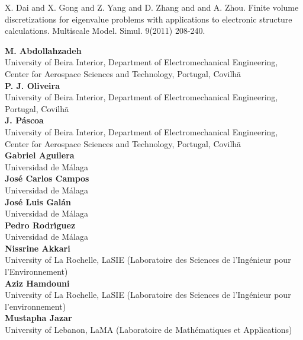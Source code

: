 \documentclass[article,A4,11pt]{llncs}%
\begin{document}

\begin{thebibliography}{10}
{\sc X. Dai and X. Gong and Z. Yang and D. Zhang and and A. Zhou}. {Finite volume discretizations for eigenvalue problems with applications to electronic structure calculations}. Multiscale Model. Simul. 9(2011) 208-240.
\end{thebibliography}

\newpage
    \noindent
    {\bf M. Abdollahzadeh}\\
    University of Beira Interior, Department of Electromechanical Engineering, Center for Aerospace Sciences and Technology, Portugal, Covilhã\\
        \noindent
    {\bf P. J. Oliveira}\\
    University of Beira Interior, Department of Electromechanical Engineering, Portugal, Covilhã\\
        \noindent
    {\bf J. Páscoa}\\
    University of Beira Interior, Department of Electromechanical Engineering, Center for Aerospace Sciences and Technology, Portugal, Covilhã\\
        \noindent
    {\bf Gabriel Aguilera}\\
    Universidad de M\'alaga\\
        \noindent
    {\bf Jos\'e Carlos Campos}\\
    Universidad de M\'alaga\\
        \noindent
    {\bf Jos\'e Luis Gal\'an}\\
    Universidad de M\'alaga\\
        \noindent
    {\bf Pedro Rodr\'{\i}guez}\\
    Universidad de M\'alaga\\
        \noindent
    {\bf Nissrine Akkari}\\
    University of La Rochelle, LaSIE (Laboratoire des Sciences de l'Ingénieur pour l'Environnement)\\
        \noindent
    {\bf Aziz Hamdouni}\\
    University of La Rochelle, LaSIE (Laboratoire des Sciences de l'Ingénieur pour l'environnement)\\
        \noindent
    {\bf Mustapha Jazar}\\
    University of Lebanon, LaMA (Laboratoire de Mathématiques et Applications)\\
\end{document}
